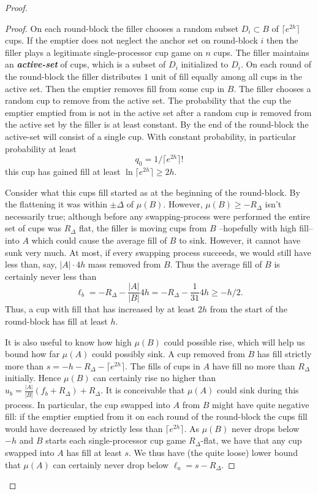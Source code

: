 \documentclass[twocolumn]{article}[10pt]
\newcommand{\defn}[1]{{\textit{\textbf{\boldmath #1}}}\xspace}
\begin{document}
\begin{proof}
\begin{proof}
  On each round-block the filler chooses a random subset $D_i \subset B$ of
  $\lceil e^{2h} \rceil$ cups. If the emptier does not neglect the anchor set
  on round-block $i$ then the filler plays a legitimate single-processor cup
  game on $n$ cups. The filler maintains an \defn{active-set} of cups, which is
  a subset of $D_i$ initialized to $D_i$. On each round of the round-block the
  filler distributes $1$ unit of fill equally among all cups in the active set.
  Then the emptier removes fill from some cup in $B$. The filler chooses a
  random cup to remove from the active set. The probability that the cup the
  emptier emptied from is not in the active set after a random cup is removed
  from the active set by the filler is at least constant. By the end of the
  round-block the active-set will consist of a single cup. With constant
  probability, in particular probability at least $$q_0 = 1/\lceil e^{2h}
  \rceil!$$ this cup has gained fill at least $\ln \lceil e^{2h} \rceil \ge
  2h$. 

  Consider what this cups fill started as at the beginning of the round-block.
  By the flattening it was within $\pm \Delta$ of $\mu(B)$. However, $\mu(B)\ge
  -R_\Delta$ isn't necessarily true; although before any swapping-process were
  performed the entire set of cups was $R_\Delta$ flat, the filler is moving
  cups from $B$ --hopefully with high fill-- into $A$ which could cause the
  average fill of $B$ to sink. However, it cannot have sunk very much. At most,
  if every swapping process succeeds, we would still have less than, say, $|A|
  \cdot 4h$ mass removed from $B$. Thus the average fill of $B$ is certainly
  never less than
  \begin{equation}
    \label{eq:Bisntsobad}
    \ell_b = -R_\Delta - \frac{|A|}{|B|} 4h = -R_\Delta - \frac{1}{31}4h\ge -h/2.
  \end{equation}
  Thus, a cup with fill that has increased by at least $2h$ from
  the start of the round-block has fill at least $h$.

  It is also useful to know how high $\mu(B)$ could possible rise, which will
  help us bound how far $\mu(A)$ could possibly sink. A cup removed from $B$
  has fill strictly more than $s = -h-R_\Delta-\lceil e^{2h} \rceil$. The
  fills of cups in $A$ have fill no more than $R_\Delta$ initially. 
  Hence $\mu(B)$ can certainly rise no higher than
  $u_b = \frac{|A|}{|B|}(f_b+R_\Delta)+R_\Delta$.
  It is conceivable that $\mu(A)$ could sink during this process. In
  particular, the cup swapped into $A$ from $B$ might have quite negative fill:
  if the emptier emptied from it on each round of the round-block 
  the cups fill would have decreased by strictly less than $\lceil e^{2h} \rceil.$ As
  $\mu(B)$ never drops below $-h$ and $B$ starts each single-processor cup game
  $R_\Delta$-flat, we have that any cup swapped into $A$ has fill at least $s$.
   We thus have (the quite loose) lower bound that $\mu(A)$ can certainly never
   drop below $\ell_a = s-R_\Delta$.


\end{proof}
\end{proof}
\end{document}

